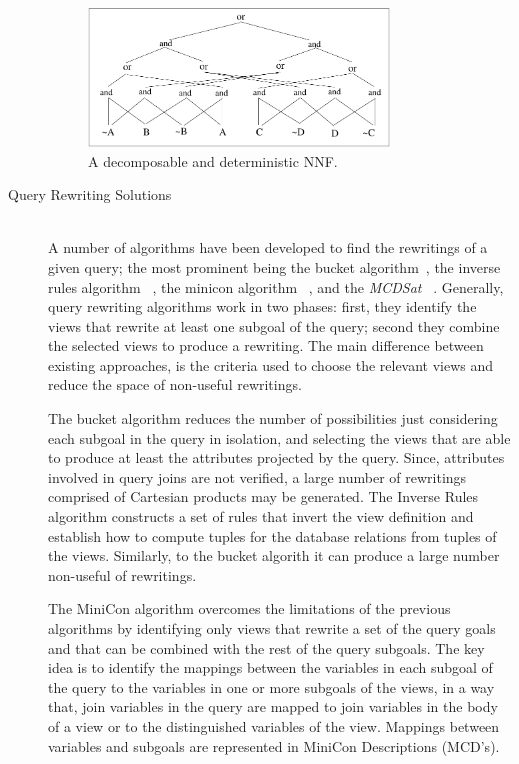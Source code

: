 \documentclass{llncs}
\begin{document}
\begin{description}
\begin{figure}
\centering
\includegraphics[width=8cm]{odd}
\caption{A decomposable and deterministic NNF.}
\label{fig:dnnf}
\end{figure}


\item[Query Rewriting Solutions] \mbox{}\\
A number of algorithms have been developed to find the rewritings of a given query; the most prominent being the bucket algorithm~\cite{levy:bucket},  the inverse rules algorithm ~\cite{duschka:answer,Qian96}, the minicon algorithm ~\cite{pottinger:minicon}, and the {\it MCDSat} ~\cite{arvelo:aaai06}. Generally, query rewriting algorithms work in two phases: first, they identify the views that rewrite at least one  subgoal of the query; second they combine the selected views to produce a rewriting. The main difference between existing approaches, is the criteria used to choose the relevant views and reduce the space of non-useful rewritings.

The bucket algorithm reduces the number of possibilities just considering each subgoal in the query in isolation, and selecting the views that are able to  produce at least the attributes projected by the query. Since, attributes involved in query joins are not verified, a large number of rewritings comprised of  Cartesian products may  be generated. 	
The Inverse Rules algorithm constructs a set of rules that invert the view definition and establish how to compute tuples for the database relations from tuples of the views. Similarly, to the bucket algorith it can produce a large number non-useful of rewritings. 

The MiniCon algorithm  overcomes the limitations of the previous algorithms by identifying only views that rewrite a set of the query goals and that  can be combined with the rest of the query subgoals. The key idea is to identify the mappings between  the variables in each subgoal of the query to the variables  in one or more subgoals of the views, in a way that, join variables in the query are mapped to join variables in the body of a view or to the distinguished variables of the view. Mappings between variables and subgoals are represented in MiniCon Descriptions (MCD's)\cite{pottinger:minicon}.


\end{description}
\end{document}
